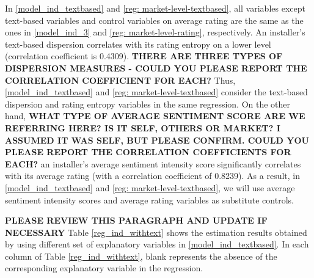 \documentclass[msom,blindrev]{informs3}
\begin{document}
In \eqref{model_ind_textbased} and \eqref{reg: market-level-textbased}, all variables except text-based variables and control variables on average rating are the same as the ones in \eqref{model_ind_3} and \eqref{reg: market-level-rating}, respectively. An installer's text-based dispersion correlates with its rating entropy on a lower level (correlation coefficient is 0.4309). \textbf{THERE ARE THREE TYPES OF DISPERSION MEASURES -  COULD YOU PLEASE REPORT THE CORRELATION COEFFICIENT FOR EACH?} Thus, \eqref{model_ind_textbased} and \eqref{reg: market-level-textbased} consider the text-based dispersion and rating entropy variables in the same regression. On the other hand,
\textbf{WHAT TYPE OF AVERAGE SENTIMENT SCORE ARE WE REFERRING HERE? IS IT SELF, OTHERS OR MARKET? I ASSUMED IT WAS SELF, BUT PLEASE CONFIRM. COULD YOU PLEASE REPORT THE CORRELATION COEFFICIENTS FOR EACH?} an installer's average sentiment intensity score significantly correlates with its average rating (with a correlation coefficient of 0.8239). As a result, in \eqref{model_ind_textbased} and \eqref{reg: market-level-textbased},  we will use average sentiment intensity scores and average rating variables as substitute controls.


\textbf{PLEASE REVIEW THIS PARAGRAPH AND UPDATE IF NECESSARY} Table \ref{reg_ind_withtext} shows the estimation results obtained by using different set of explanatory variables in \eqref{model_ind_textbased}. In each column of Table \ref{reg_ind_withtext}, blank represents the absence of the corresponding explanatory variable in the regression.
\end{document}
